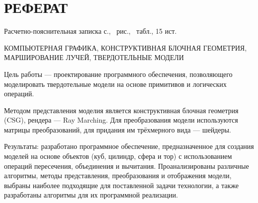 \section*{РЕФЕРАТ}

Расчетно-пояснительная записка \pageref{LastPage} с., \totalfigures\ рис., \totaltables\ табл., 15 ист.

КОМПЬЮТЕРНАЯ ГРАФИКА, КОНСТРУКТИВНАЯ БЛОЧНАЯ ГЕОМЕТРИЯ, МАРШИРОВАНИЕ ЛУЧЕЙ, ТВЕРДОТЕЛЬНЫЕ МОДЕЛИ

Цель работы --- проектирование программного обеспечения, позволяющего моделировать твердотельные модели на основе примитивов и логических операций.

Методом представления моделия является  конструктивная  блочная геометрия  (CSG),
рендера  ---  Ray Marching.
Для  преобразования  модели  используются
матрицы преобразований, для придания им трёхмерного вида --- шейдеры.

Результаты: разработано программное обеспечение, предназначенное для создания моделей на основе объектов (куб, цилиндр, сфера и тор) с использованием операций пересечения, объединения и
вычитания.
Проанализированы  различные  алгоритмы,  методы  представления,
преобразования  и  отображения  модели,  выбраны  наиболее  подходящие  для поставленной  задачи  технологии,  а  также  разработаны  алгоритмы  для  их
программной реализации.

\pagebreak